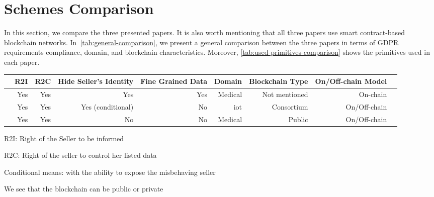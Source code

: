 \section{Schemes Comparison}
\label{sec:schemes-comparison}

In this section, we compare the three presented papers.
It is also worth mentioning that all three papers use smart contract-based blockchain networks.
In~\cref{tab:general-comparison}, we present a general comparison between 
the three papers in terms of GDPR requirements compliance, domain, and blockchain characteristics.
Moreover, \cref{tab:used-primitives-comparison} shows the primitives used in each paper.

\begin{table*}[h!]\centering
\caption{General schemes comparison}\label{tab:general-comparison}
\scriptsize
\begin{threeparttable}
\begin{tabular}{lrrrrrrrr}\toprule
&R2I\tnote{1} &R2C\tnote{2} &Hide Seller's Identity &Fine Grained Data &Domain &Blockchain Type &On/Off-chain Model \\\midrule
\cite{xue2023blockchain} &Yes &Yes &Yes &Yes &Medical &Not mentioned\tnote{4} &On-chain \\
\cite{liu2022blockchain} &Yes &Yes &Yes (conditional)\tnote{3} &No &\ac{iot} &Consortium &On/Off-chain \\
\cite{alsharif2020blockchain} &Yes &Yes &No &No &Medical &Public &On/Off-chain \\
\bottomrule
\end{tabular}
\begin{tablenotes}
    \item[1] R2I: Right of the Seller to be informed
    \item[2] R2C: Right of the seller to control her listed data
    \item[3] Conditional means: with the ability to expose the misbehaving seller
    \item[4] We see that the blockchain can be public or private
\end{tablenotes}
\end{threeparttable}
\end{table*}

